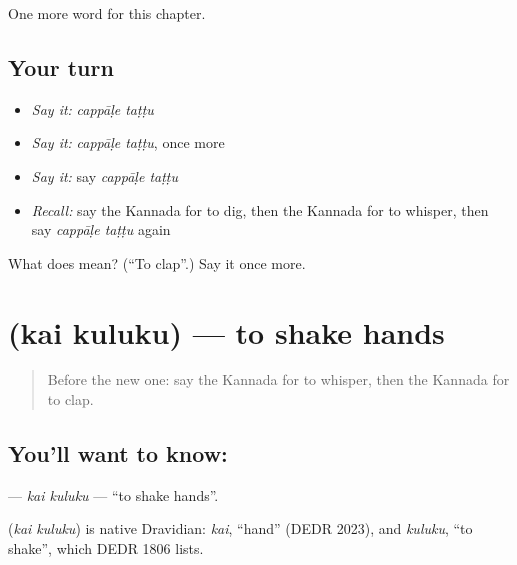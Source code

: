 \begin{grammarlens}[title={What you've built}]
One more word for this chapter.
\end{grammarlens}

\subsection*{Your turn}
\begin{itemize}
\raggedright
  \item \emph{Say it:} \emph{cappāḷe taṭṭu}
  \item \emph{Say it:} \emph{cappāḷe taṭṭu}, once more
  \item \emph{Say it:} say \emph{cappāḷe taṭṭu}
  \item \emph{Recall:} say the Kannada for to dig, then the Kannada for to whisper, then say \emph{cappāḷe taṭṭu} again
\end{itemize}

\begin{tcolorbox}[breakable,colback=teal!4,colframe=teal!35!black,title={Before you move on}]
What does   mean? (\textquotedblleft{}To clap\textquotedblright{}.) Say it once more.
\end{tcolorbox}
\section[\texorpdfstring{\kn{ಕೈ} \kn{ಕುಲುಕು} (kai kuluku)}{ಕೈ ಕುಲುಕು (kai kuluku)}]{  (kai kuluku) — to shake hands}

\label{lesson:KA-C280-kai-kuluku}



\begin{quote}
Before the new one: say the Kannada for to whisper, then the Kannada for to clap.
\end{quote}

\subsection*{You'll want to know:  }
\textbf{ } — \emph{kai kuluku} — \textquotedblleft{}to shake hands\textquotedblright{}.

\begin{cousinweb}
\textbf{ } (\emph{kai kuluku}) is native Dravidian: \emph{kai}, \textquotedblleft{}hand\textquotedblright{} (DEDR 2023), and \emph{kuluku}, \textquotedblleft{}to shake\textquotedblright{}, which DEDR 1806 lists.
\end{cousinweb}

